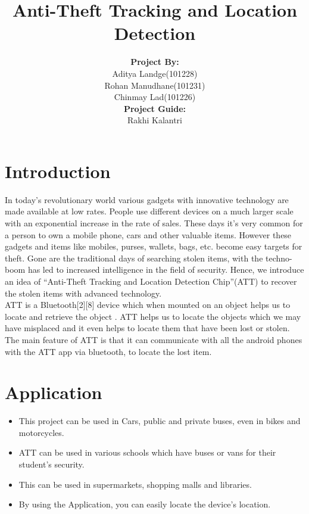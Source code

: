 \documentclass[a4paper,10pt]{report}
\title{\textbf{Anti-Theft Tracking and Location Detection}}
\author{\textbf{Project By:}\\Aditya Landge(101228)\\Rohan Manudhane(101231)\\Chinmay Lad(101226)\\[0.3in]\textbf{Project Guide:}\\Rakhi Kalantri}
\begin{document}
\maketitle
\tableofcontents

\chapter{Introduction}
In today’s revolutionary world various gadgets with innovative technology are made available at low rates. People use different devices on a much larger scale with an exponential increase in the rate of sales. These days it’s very common for a person to own a mobile phone, cars and other valuable items. However these gadgets and items like mobiles, purses, wallets, bags, etc. become easy targets for theft. Gone are the traditional days of searching stolen items, with the techno-boom has led to increased intelligence in the field of security. Hence, we introduce an idea of “Anti-Theft Tracking and Location Detection Chip”(ATT) to recover the stolen items with advanced technology.\\
ATT is a Bluetooth[2][8] device which when mounted on an object helps us to locate and retrieve the object . ATT helps us to locate the objects which we may have misplaced and it even helps to locate them that have been lost or stolen. The main feature of ATT  is that it can communicate with all the android phones with the ATT app via bluetooth, to  locate the lost item. \\

\chapter{Application}
\begin{itemize}
 \item This project can be used in Cars, public and private buses, even in bikes and motorcycles.
 \item ATT can be used in various schools which have buses or vans for their student’s security.
 \item This can be used in supermarkets, shopping malls and libraries.
 \item By using the Application, you can easily locate the device's location.
\end{itemize}
\end{document}
